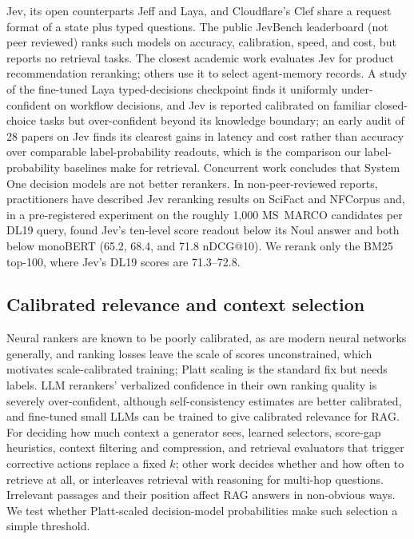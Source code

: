 Jev\cite{jev}, its open counterparts Jeff\cite{jeff} and Laya\cite{laya}, and Cloudflare's Clef\cite{clef} share a request format of a state plus typed questions.
The public JevBench leaderboard\cite{jevbench} (not peer reviewed) ranks such models on accuracy, calibration, speed, and cost, but reports no retrieval tasks.
The closest academic work evaluates Jev for product recommendation reranking\cite{lyu2026jevrec}; others use it to select agent-memory records\cite{sharma2026selection}.
A study of the fine-tuned Laya typed-decisions checkpoint finds it uniformly under-confident on workflow decisions\cite{laya2026assessor}, and Jev is reported calibrated on familiar closed-choice tasks but over-confident beyond its knowledge boundary\cite{jev2026selfknowledge}; an early audit of 28 papers on Jev finds its clearest gains in latency and cost rather than accuracy over comparable label-probability readouts\cite{tang2026tdmaudit}, which is the comparison our label-probability baselines make for retrieval. Concurrent work concludes that System One decision models are not better rerankers\cite{dinzinger2026systemone}.
In non-peer-reviewed reports, practitioners have described Jev reranking results on SciFact and NFCorpus\cite{denser2026jevqwen} and, in a pre-registered experiment on the roughly 1{,}000 MS~MARCO candidates per DL19 query, found Jev's ten-level score readout below its Noul answer and both below monoBERT (65.2, 68.4, and 71.8 nDCG@10)\cite{carlaiau2026protocol}. We rerank only the BM25 top-100, where Jev's DL19 scores are 71.3--72.8.

\subsection{Calibrated relevance and context selection}

Neural rankers are known to be poorly calibrated\cite{penha2021calibration}, as are modern neural networks generally\cite{guo2017calibration}, and ranking losses leave the scale of scores unconstrained, which motivates scale-calibrated training\cite{yan2022scale}; Platt scaling\cite{platt1999} is the standard fix but needs labels. LLM rerankers' verbalized confidence in their own ranking quality is severely over-confident, although self-consistency estimates are better calibrated\cite{ni2026predict}, and fine-tuned small LLMs can be trained to give calibrated relevance for RAG\cite{diras2024}.
For deciding how much context a generator sees, learned selectors\cite{meng2025dps}, score-gap heuristics\cite{adaptivek2025}, context filtering and compression\cite{wang2023filco,xu2024recomp,chirkova2025provence}, and retrieval evaluators that trigger corrective actions\cite{yan2024crag} replace a fixed $k$; other work decides whether and how often to retrieve at all\cite{asai2024selfrag,jeong2024adaptiverag}, or interleaves retrieval with reasoning for multi-hop questions\cite{trivedi2023ircot}. Irrelevant passages and their position affect RAG answers in non-obvious ways\cite{cuconasu2024noise,liu2024lost}.
We test whether Platt-scaled decision-model probabilities make such selection a simple threshold.
